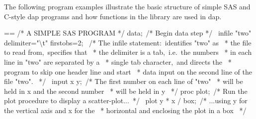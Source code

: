 \documentclass{book}
\makeatletter
\newenvironment{Texinfopreformatted}{%
  \par\GNUTobeylines\obeyspaces\frenchspacing\parskip=\z@\parindent=\z@}{}
{\catcode`\^^M=13 \gdef\GNUTobeylines{\catcode`\^^M=13 \def^^M{\null\par}}}
\newenvironment{Texinfoindented}{\begin{list}{}{}\item\relax}{\end{list}}
\renewcommand{\_}{\Texinfounderscore\discretionary{}{}{}}
\makeatother
\begin{document}
The following program examples illustrate the basic structure
of simple SAS and C-style dap programs and how functions in the library are used in dap.

\begin{Texinfoindented}
\begin{Texinfopreformatted}%
\ttfamily /* A SIMPLE SAS PROGRAM */
data;\                  /* Begin data step */
\ infile "two" delimiter="\textbackslash{}t" firstobs=2;
\                       /* The infile statement:\ identifies "two" as
\                        * the file to read from,\ specifies that
\                        * the delimiter is a tab,\ i.e.\ the numbers
\                        * in each line in "two" are separated by a
\                        * single tab character,\ and directs the
\                        * program to skip one header line and start
\                        * data input on the second line of the file "two".
\                        */
\ input x y;\            /* The first number on each line of "two"
\                        * will be held in x and the second number
\                        * will be held in y
\                        */
proc plot;\             /* Run the plot procedure to display a scatter-plot...\ */
\ plot y * x / box;\     /* ...using y for the vertical axis and x for the
\                        * horizontal and enclosing the plot in a box
\                        */

\end{Texinfopreformatted}
\end{Texinfoindented}
\end{document}
